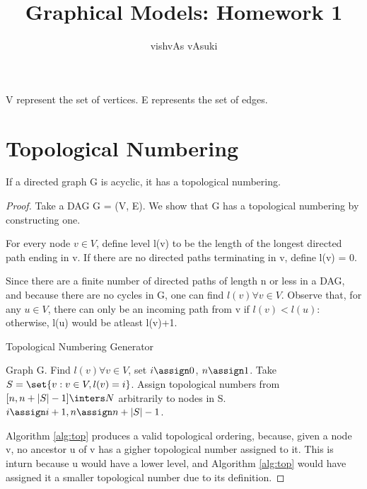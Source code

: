\documentclass{article}
\title{Graphical Models: Homework 1}
\author{vishvAs vAsuki}
\begin{document}
\maketitle

\begin{notation}
V represent the set of vertices. E represents the set of edges.
\end{notation}


\section{Topological Numbering}
\begin{lem}
If a directed graph G is acyclic, it has a topological numbering.
\end{lem}
\begin{proof}
Take a DAG G = (V, E). We show that G has a topological numbering by constructing one.

For every node $v \in V$, define level l(v) to be the length of the longest directed path ending in v. If there are no directed paths terminating in v, define l(v) = 0.

Since there are a finite number of directed paths of length n or less in a DAG, and because there are no cycles in G, one can find $l(v) \forall v \in V$. Observe that, for any $u \in V$, there can only be an incoming path from v if $l(v) < l(u)$: otherwise, l(u) would be atleast l(v)+1.

\begin{algorithm}[h!]
   \caption{Topological Numbering Generator}
   \label{alg:top}
\begin{algorithmic}
    Graph G.
   \STATE Find $l(v) \forall v \in V$, set $i \assign 0$, $n \assign 1$.
   \REPEAT
   \STATE Take $S = \set{v: v \in V, l(v) = i}$. Assign topological numbers from $[n, n+|S|-1] \inters N$ arbitrarily to nodes in S.
   \STATE $i \assign i+1, n \assign n+|S|-1$.
\end{algorithmic}
\end{algorithm}

Algorithm \ref{alg:top} produces a valid topological ordering, because, given a node v, no ancestor u of v has a gigher topological number assigned to it. This is inturn because u would have a lower level, and Algorithm \ref{alg:top} would have assigned it a smaller topological number due to its definition.

\end{proof}
\end{document}
